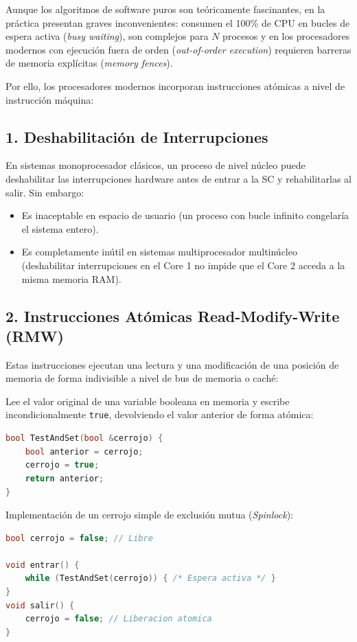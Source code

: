 Aunque los algoritmos de software puros son teóricamente fascinantes, en la práctica presentan graves inconvenientes: consumen el 100\% de CPU en bucles de espera activa (\textit{busy waiting}), son complejos para $N$ procesos y en los procesadores modernos con ejecución fuera de orden (\textit{out-of-order execution}) requieren barreras de memoria explícitas (\textit{memory fences}).

Por ello, los procesadores modernos incorporan instrucciones atómicas a nivel de instrucción máquina:

\subsection{1. Deshabilitación de Interrupciones}
En sistemas monoprocesador clásicos, un proceso de nivel núcleo puede deshabilitar las interrupciones hardware antes de entrar a la SC y rehabilitarlas al salir. Sin embargo:
\begin{itemize}
    \item Es inaceptable en espacio de usuario (un proceso con bucle infinito congelaría el sistema entero).
    \item Es completamente inútil en sistemas multiprocesador multinúcleo (deshabilitar interrupciones en el Core 1 no impide que el Core 2 acceda a la misma memoria RAM).
\end{itemize}

\subsection{2. Instrucciones Atómicas Read-Modify-Write (RMW)}
Estas instrucciones ejecutan una lectura y una modificación de una posición de memoria de forma indivisible a nivel de bus de memoria o caché:

\begin{definicion}
Lee el valor original de una variable booleana en memoria y escribe incondicionalmente \texttt{true}, devolviendo el valor anterior de forma atómica:
\begin{lstlisting}[language=C++]
bool TestAndSet(bool &cerrojo) {
    bool anterior = cerrojo;
    cerrojo = true;
    return anterior;
}
\end{lstlisting}
Implementación de un cerrojo simple de exclusión mutua (\textit{Spinlock}):
\begin{lstlisting}[language=C++]
bool cerrojo = false; // Libre

void entrar() {
    while (TestAndSet(cerrojo)) { /* Espera activa */ }
}
void salir() {
    cerrojo = false; // Liberacion atomica
}
\end{lstlisting}
\end{definicion}

